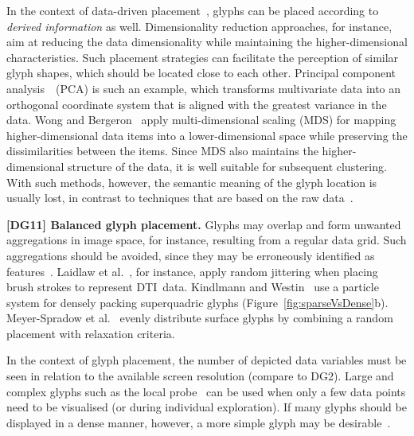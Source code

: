 In the context of data-driven placement~\cite{ward02glyphPlacement}, glyphs can be placed according to \emph{derived information} as well.
Dimensionality reduction approaches, for instance, aim at reducing the data dimensionality while maintaining the higher-dimen\-sional characteristics.
Such placement strategies can facilitate the perception of similar glyph shapes, which should be located close to each other.
Principal component analysis~\cite{WardGuo11shapeSpace}~(PCA) is such an example, which transforms multivariate data into an orthogonal coordinate system that is aligned with the greatest variance in the data.
Wong and Bergeron~\cite{WongBergeron97multiDimScaling} apply multi-dimensional scaling (MDS) for mapping higher-dimen\-sional data items into a lower-dimen\-sional space while preserving the dissimilarities between the items. Since MDS also maintains the higher-dimen\-sional structure of the data, it is well suitable for subsequent clustering.
With such methods, however, the semantic meaning of the glyph location is usually lost, in contrast to techniques that are based on the raw data~\cite{ward02glyphPlacement}.

\textbf{[DG11] Balanced glyph placement.}
Glyphs may overlap and form unwanted aggregations in image space, for instance, resulting from a regular data grid. 
Such aggregations should be avoided, since they may be erroneously identified as features~\cite{Ropinski11glyphs, ward02glyphPlacement}.
Laidlaw et al.~\cite{laidlaw98}, for instance, apply random jittering when placing brush strokes to represent DTI~data.
Kindlmann and Westin~\cite{kindlmannWestin06glyphPacking} use a particle system for densely packing superquadric glyphs 
(Figure~\ref{fig:sparseVsDense}b).
Meyer-Spradow et al.~\cite{meyer-spradow08specGlyphs} evenly distribute surface glyphs by combining a random placement with relaxation criteria.

In the context of glyph placement, the number of depicted data variables must be seen in relation to the available screen resolution (compare to DG2).
Large and complex glyphs such as the local probe~\cite{deLeeuwVanWijk93probe} can be used when only a few data points need to be visualised (or during individual exploration).
If many glyphs should be displayed in a dense manner, however, a more simple glyph may be desirable~\cite{pickettGrinstein88iconic, kindlmannWestin06glyphPacking, lie09glyphs}.


